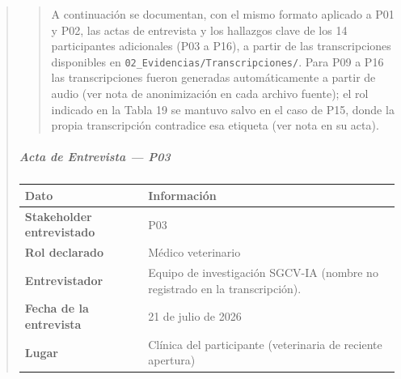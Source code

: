 \documentclass[
]{article}
\newcounter{none} %
\begin{document}
\begin{quote}
\begin{quote}
A continuación se documentan, con el mismo formato aplicado a P01 y P02,
las actas de entrevista y los hallazgos clave de los 14 participantes
adicionales (P03 a P16), a partir de las transcripciones disponibles en
\texttt{02\_Evidencias/Transcripciones/}. Para P09 a P16 las transcripciones
fueron generadas automáticamente a partir de audio (ver nota de
anonimización en cada archivo fuente); el rol indicado en la Tabla 19 se
mantuvo salvo en el caso de P15, donde la propia transcripción contradice
esa etiqueta (ver nota en su acta).
\end{quote}

\subparagraph{Acta de Entrevista --- P03}\label{acta-entrevista-p03}

{\def\LTcaptype{none} %
\begin{longtable}[]{|
  >{\raggedright\arraybackslash}p{}|
  >{\raggedright\arraybackslash}p{}|}
\hline
\begin{minipage}[b]{\linewidth}\centering
\textbf{Dato}
\end{minipage} & \begin{minipage}[b]{\linewidth}\centering
\textbf{Información}
\end{minipage} \\
\hline
\endhead
\hline
\endlastfoot
\textbf{Stakeholder entrevistado} & \begin{minipage}[t]{\linewidth}\raggedright
P03
\end{minipage} \\
\hline
\textbf{Rol declarado} & \begin{minipage}[t]{\linewidth}\raggedright
Médico veterinario
\end{minipage} \\
\hline
\textbf{Entrevistador} & \begin{minipage}[t]{\linewidth}\raggedright
Equipo de investigación SGCV-IA (nombre no registrado en la transcripción).
\end{minipage} \\
\hline
\textbf{Fecha de la entrevista} & \begin{minipage}[t]{\linewidth}\raggedright
21 de julio de 2026
\end{minipage} \\
\hline
\textbf{Lugar} & \begin{minipage}[t]{\linewidth}\raggedright
Clínica del participante (veterinaria de reciente apertura)

\end{minipage}
\end{longtable}}
\end{quote}
\end{document}
